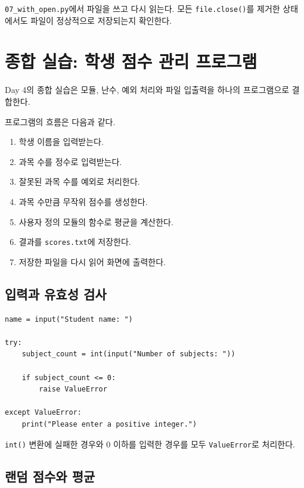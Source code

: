\documentclass[11pt,a4paper]{article}
\begin{document}
\begin{practicebox}
\texttt{07\_with\_open.py}에서 파일을 쓰고 다시 읽는다. 모든 \texttt{file.close()}를 제거한 상태에서도 파일이 정상적으로 저장되는지 확인한다.
\end{practicebox}

\section{종합 실습: 학생 점수 관리 프로그램}

Day 4의 종합 실습은 모듈, 난수, 예외 처리와 파일 입출력을 하나의 프로그램으로 결합한다.

프로그램의 흐름은 다음과 같다.

\begin{enumerate}[leftmargin=1.8em]
    \item 학생 이름을 입력받는다.
    \item 과목 수를 정수로 입력받는다.
    \item 잘못된 과목 수를 예외로 처리한다.
    \item 과목 수만큼 무작위 점수를 생성한다.
    \item 사용자 정의 모듈의 함수로 평균을 계산한다.
    \item 결과를 \texttt{scores.txt}에 저장한다.
    \item 저장한 파일을 다시 읽어 화면에 출력한다.
\end{enumerate}

\subsection{입력과 유효성 검사}

\begin{lstlisting}
name = input("Student name: ")

try:
    subject_count = int(input("Number of subjects: "))

    if subject_count <= 0:
        raise ValueError

except ValueError:
    print("Please enter a positive integer.")
\end{lstlisting}

\texttt{int()} 변환에 실패한 경우와 0 이하를 입력한 경우를 모두 \texttt{ValueError}로 처리한다.

\subsection{랜덤 점수와 평균}
\end{document}
